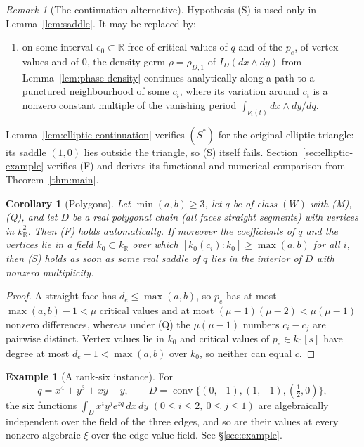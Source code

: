 \documentclass[11pt]{article}
\numberwithin{equation}{section}
\newtheorem{corollary}[corollary]{Corollary}
\theoremstyle{definition}
\newtheorem{example}[example]{Example}
\theoremstyle{remark}
\newtheorem{remark}[remark]{Remark}
\newcommand{\R}{\mathbb R}
\newcommand{\dd}{\,d}
\begin{document}
\begin{remark}[The continuation alternative]\label{rem:Sstar}
Hypothesis (S) is used only in Lemma~\ref{lem:saddle}. It may be replaced by:
\begin{enumerate}[leftmargin=2.6em]
\item[(S$^*$)] on some interval $e_0\subset\R$ free of critical values of $q$
 and of the $p_e$, of vertex values and of $0$, the density germ
 $\rho=\rho_{D,1}$ of $I_D(dx\wedge dy)$ from
 Lemma~\ref{lem:phase-density} continues analytically along a path to a punctured
 neighbourhood of some $c_i$, where its variation around $c_i$ is a nonzero
 constant multiple of the vanishing period $\int_{\nu_i(t)}dx\wedge dy/dq$.
\end{enumerate}
Lemma~\ref{lem:elliptic-continuation} verifies $(S^*)$ for the original
elliptic triangle: its saddle $(1,0)$ lies outside the triangle, so (S)
itself fails. Section~\ref{sec:elliptic-example} verifies (F) and derives
its functional and numerical comparison from Theorem~\ref{thm:main}.
\end{remark}

\begin{corollary}[Polygons]\label{cor:polygon}
Let $\min(a,b)\ge3$, let $q$ be of class $(W)$ with \textup{(M)}, \textup{(Q)},
and let $D$ be a real polygonal chain (all faces straight segments) with vertices
in $k_\R^2$. Then \textup{(F)} holds automatically. If moreover the coefficients
of $q$ and the vertices lie in a field $k_0\subset k_\R$ over which
$[k_0(c_i):k_0]\ge\max(a,b)$ for all $i$, then \textup{(S)} holds as soon as some
real saddle of $q$ lies in the interior of $D$ with nonzero multiplicity.
\end{corollary}
\begin{proof}
A straight face has $d_e\le\max(a,b)$, so $p_e$ has at most $\max(a,b)-1<\mu$
critical values and at most $(\mu-1)(\mu-2)<\mu(\mu-1)$ nonzero differences,
whereas under (Q) the $\mu(\mu-1)$ numbers $c_i-c_j$ are pairwise distinct.
Vertex values lie in $k_0$ and critical values of $p_e\in k_0[s]$ have degree at
most $d_e-1<\max(a,b)$ over $k_0$, so neither can equal $c$.
\end{proof}

\begin{example}[A rank-six instance]\label{ex:intro}
For
\[
 q=x^4+y^3+xy-y,\qquad D=\operatorname{conv}\{(0,-1),(1,-1),(\tfrac12,0)\},
\]
the six functions $\int_D x^iy^je^{zq}\dd x\dd y$ $(0\le i\le2,\ 0\le j\le1)$ are
algebraically independent over the field of the three edges, and so are their
values at every nonzero algebraic $\xi$ over the edge-value field. See
\S\ref{sec:example}.
\end{example}
\end{document}
